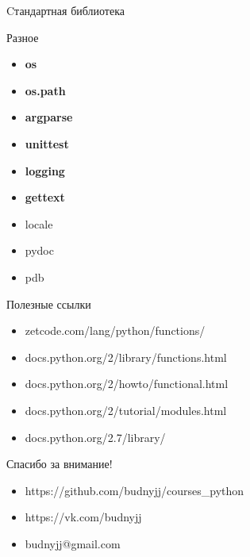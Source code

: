 \documentclass[hyperref={pdftex,unicode}]{beamer}
\begin{document}
\begin{frame}{Cтандартная библиотека}
{\begin{minipage}{0.25\linewidth}
  \end{minipage}
  \hfill
  \begin{minipage}{0.2\linewidth}
    \centering Разное
    \vspace{2mm}
    \begin{itemize}
    \item \textbf{os}
    \item \textbf{os.path}
    \item \textbf{argparse}
    \item \textbf{unittest}
    \item \textbf{logging}
    \item \textbf{gettext}
    \item locale
    \item pydoc
    \item pdb
    \end{itemize}
  \end{minipage}
}
\end{frame}

\begin{frame}{Полезные ссылки}
  \begin{itemize}
    \item zetcode.com/lang/python/functions/
    \item docs.python.org/2/library/functions.html
    \item docs.python.org/2/howto/functional.html
    \item docs.python.org/2/tutorial/modules.html
    \item docs.python.org/2.7/library/
  \end{itemize}
\end{frame}

\begin{frame}{Спасибо за внимание!}
  \begin{itemize}
  \item https://github.com/budnyjj/courses\_python
  \item https://vk.com/budnyjj
  \item budnyjj@gmail.com
  \end{itemize}
\end{frame}
\end{document}
